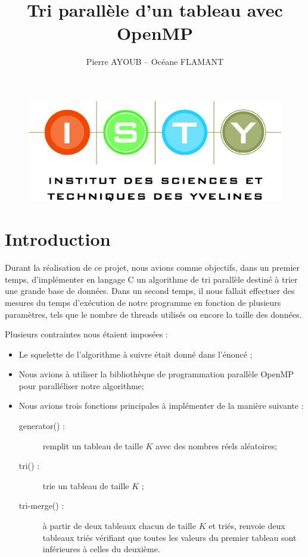 \documentclass[12pt]{article}
\begin{document}
\title{Tri parallèle d'un tableau avec OpenMP}
\author{Pierre AYOUB -- Océane FLAMANT}

\maketitle

\begin{figure}[b]
    \centering
    \includegraphics[scale=0.3]{pictures/isty.jpg}
\end{figure}

\tableofcontents

\section{Introduction}

Durant la réalisation de ce projet, nous avions comme objectifs, dans un premier
temps, d'implémenter en langage C un algorithme de tri parallèle destiné à trier
une grande base de données. Dans un second temps, il nous fallait effectuer des
mesures du temps d'exécution de notre programme en fonction de plusieurs
paramètres, tels que le nombre de threads utilisés ou encore la taille des données.

Plusieurs contraintes nous étaient imposées :
\begin{itemize}  
    \item{Le squelette de l'algorithme à suivre était donné dans l'énoncé ;}
    \item{Nous avions à utiliser la bibliothèque de programmation parallèle OpenMP pour paralléliser notre algorithme;}
    \item{Nous avions trois fonctions principales à implémenter de la manière suivante :}
        \begin{description}
            \item[generator() :] {remplit un tableau de taille $K$ avec des nombres réels aléatoires;}
            \item[tri() :] {trie un tableau de taille $K$ ;}
            \item[tri-merge() :] {à partir de deux tableaux chacun de taille $K$ et triés, renvoie deux tableaux triés vérifiant que toutes les valeurs du premier tableau sont inférieures à celles du deuxième.}
        \end{description}
\end{itemize}
\end{document}
